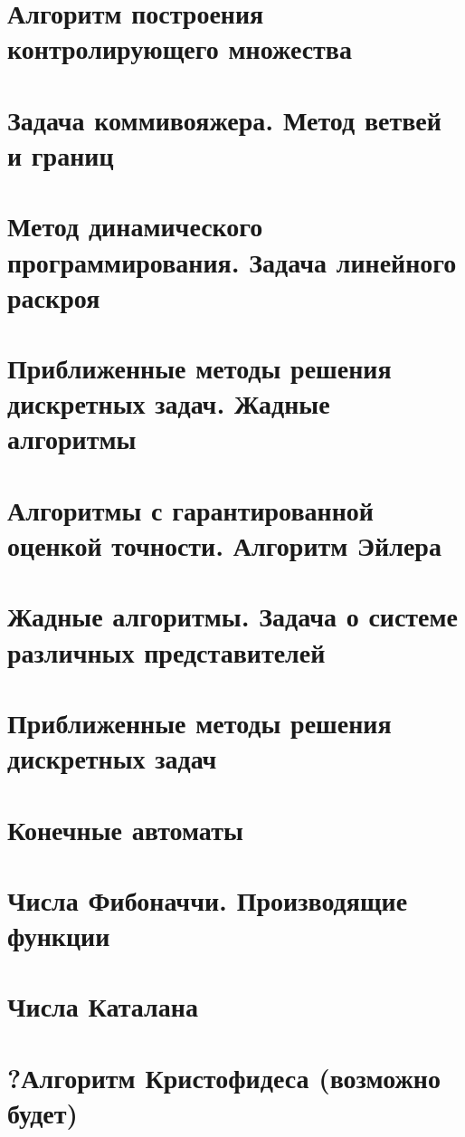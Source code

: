 \documentclass[12pt, fleqn]{article}
\begin{document}
  \section{Алгоритм построения контролирующего множества}
  \newpage

  
  \newpage

  \section{Задача коммивояжера. Метод ветвей и границ}
  \newpage

  \section{Метод динамического программирования. Задача линейного раскроя}


  \section{Приближенные методы решения дискретных задач. Жадные алгоритмы}


  \section{Алгоритмы с гарантированной оценкой точности. Алгоритм Эйлера}


  \section{Жадные алгоритмы. Задача о системе различных представителей}


  \section{Приближенные методы решения дискретных задач}


  \section{Конечные автоматы}


  \section{Числа Фибоначчи. Производящие функции}


  \section{Числа Каталана}


  \section{?Алгоритм Кристофидеса (возможно будет)}
\end{document}
